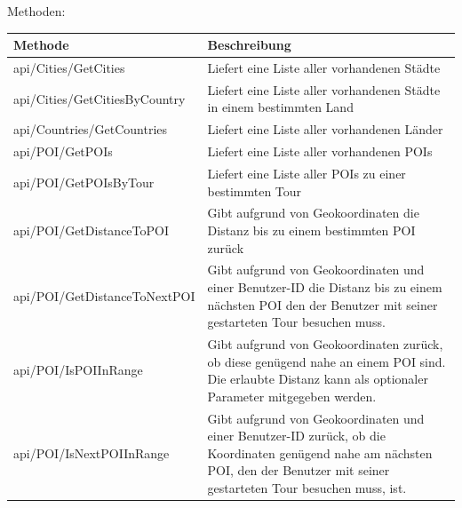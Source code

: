 \documentclass[a4paper,10pt,xetex]{article}
\begin{document}
\bigskip

Methoden:

\begin{longtabu} to \textwidth { | l | X[l] | }
  \hline
  \textbf{Methode} & \textbf{Beschreibung} \\
  \hline
  \endhead

    api/Cities/GetCities &
    Liefert eine Liste aller vorhandenen St\"adte\\\hline
    api/Cities/GetCitiesByCountry &
    Liefert eine Liste aller vorhandenen St\"adte in einem bestimmten Land\\\hline
      api/Countries/GetCountries &
    Liefert eine Liste aller vorhandenen L\"ander\\\hline
    api/POI/GetPOIs &
    Liefert eine Liste aller vorhandenen POIs\\\hline
    api/POI/GetPOIsByTour &
    Liefert eine Liste aller POIs zu einer bestimmten Tour\\\hline
    api/POI/GetDistanceToPOI &
    Gibt aufgrund von Geokoordinaten die Distanz bis zu einem bestimmten POI zur\"uck\\\hline
    api/POI/GetDistanceToNextPOI &
    Gibt aufgrund von Geokoordinaten und einer Benutzer-ID die Distanz bis zu einem n\"achsten POI
      den der Benutzer mit seiner gestarteten Tour besuchen muss.\\\hline
    api/POI/IsPOIInRange &
    Gibt aufgrund von Geokoordinaten zur\"uck, ob diese gen\"ugend nahe an einem POI sind. Die
      erlaubte Distanz kann als optionaler Parameter mitgegeben werden. \\\hline
    api/POI/IsNextPOIInRange &
    Gibt aufgrund von Geokoordinaten und einer Benutzer-ID zur\"uck, ob die Koordinaten gen\"ugend
      nahe am n\"achsten POI, den der Benutzer mit seiner gestarteten Tour besuchen muss, ist.


\end{longtabu}
\end{document}
